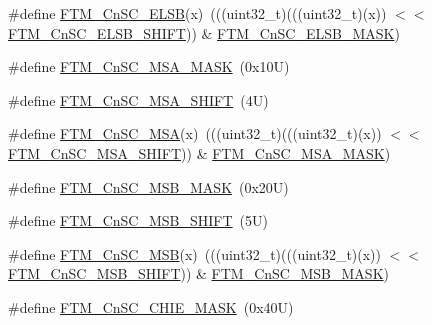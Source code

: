 \begin{DoxyCompactItemize}
\item 
\#define \mbox{\hyperlink{group___f_t_m___register___masks_gac412f4d8345a144bbaaaaffe4d9daba5}{F\+T\+M\+\_\+\+Cn\+S\+C\+\_\+\+E\+L\+SB}}(x)~(((uint32\+\_\+t)(((uint32\+\_\+t)(x)) $<$$<$ \mbox{\hyperlink{group___f_t_m___register___masks_gac508e0ba6b0d6cb0cdab5ef823a640d7}{F\+T\+M\+\_\+\+Cn\+S\+C\+\_\+\+E\+L\+S\+B\+\_\+\+S\+H\+I\+FT}})) \& \mbox{\hyperlink{group___f_t_m___register___masks_ga7f4800478dfa63921e229a7ea4a7c067}{F\+T\+M\+\_\+\+Cn\+S\+C\+\_\+\+E\+L\+S\+B\+\_\+\+M\+A\+SK}})
\item 
\#define \mbox{\hyperlink{group___f_t_m___register___masks_gac8e0a97177b0413ce86f6780d47bb067}{F\+T\+M\+\_\+\+Cn\+S\+C\+\_\+\+M\+S\+A\+\_\+\+M\+A\+SK}}~(0x10\+U)
\item 
\#define \mbox{\hyperlink{group___f_t_m___register___masks_ga8f21240c09b409447eb17431135f7448}{F\+T\+M\+\_\+\+Cn\+S\+C\+\_\+\+M\+S\+A\+\_\+\+S\+H\+I\+FT}}~(4\+U)
\item 
\#define \mbox{\hyperlink{group___f_t_m___register___masks_gaecd029a7d5911c7c6287cd117f7c3ff1}{F\+T\+M\+\_\+\+Cn\+S\+C\+\_\+\+M\+SA}}(x)~(((uint32\+\_\+t)(((uint32\+\_\+t)(x)) $<$$<$ \mbox{\hyperlink{group___f_t_m___register___masks_ga8f21240c09b409447eb17431135f7448}{F\+T\+M\+\_\+\+Cn\+S\+C\+\_\+\+M\+S\+A\+\_\+\+S\+H\+I\+FT}})) \& \mbox{\hyperlink{group___f_t_m___register___masks_gac8e0a97177b0413ce86f6780d47bb067}{F\+T\+M\+\_\+\+Cn\+S\+C\+\_\+\+M\+S\+A\+\_\+\+M\+A\+SK}})
\item 
\#define \mbox{\hyperlink{group___f_t_m___register___masks_ga88e610eb6f4e969823fa3cef98a3d8e4}{F\+T\+M\+\_\+\+Cn\+S\+C\+\_\+\+M\+S\+B\+\_\+\+M\+A\+SK}}~(0x20\+U)
\item 
\#define \mbox{\hyperlink{group___f_t_m___register___masks_gaeb80d087156b2b23c6c308cc3339487d}{F\+T\+M\+\_\+\+Cn\+S\+C\+\_\+\+M\+S\+B\+\_\+\+S\+H\+I\+FT}}~(5\+U)
\item 
\#define \mbox{\hyperlink{group___f_t_m___register___masks_ga26e08186d9d10869db12ddfe3bf39d25}{F\+T\+M\+\_\+\+Cn\+S\+C\+\_\+\+M\+SB}}(x)~(((uint32\+\_\+t)(((uint32\+\_\+t)(x)) $<$$<$ \mbox{\hyperlink{group___f_t_m___register___masks_gaeb80d087156b2b23c6c308cc3339487d}{F\+T\+M\+\_\+\+Cn\+S\+C\+\_\+\+M\+S\+B\+\_\+\+S\+H\+I\+FT}})) \& \mbox{\hyperlink{group___f_t_m___register___masks_ga88e610eb6f4e969823fa3cef98a3d8e4}{F\+T\+M\+\_\+\+Cn\+S\+C\+\_\+\+M\+S\+B\+\_\+\+M\+A\+SK}})
\item 
\#define \mbox{\hyperlink{group___f_t_m___register___masks_ga2622c4a4a5b1c7b247c8b53d3f61c112}{F\+T\+M\+\_\+\+Cn\+S\+C\+\_\+\+C\+H\+I\+E\+\_\+\+M\+A\+SK}}~(0x40\+U)
$$
\end{DoxyCompactItemize}

